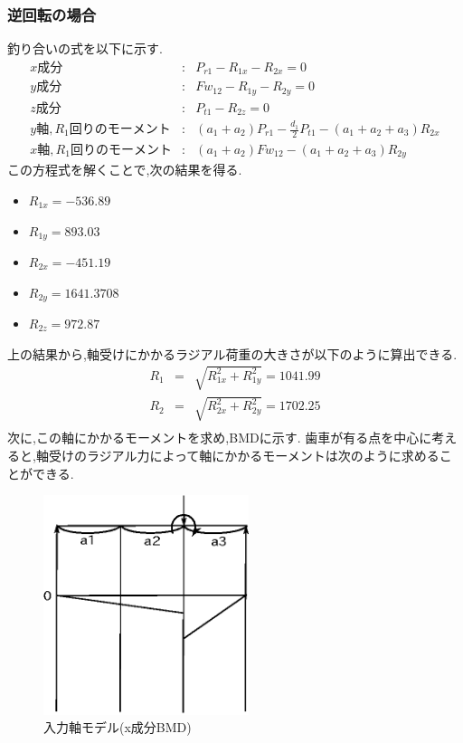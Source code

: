 \subsubsection{逆回転の場合}
釣り合いの式を以下に示す.
\begin{eqnarray}
x成分&:&P_{r1}-R_{1x}-R_{2x}=0\\
y成分&:&Fw_{12}-R_{1y}-R_{2y}=0\\
z成分&:&P_{t1}-R_{2z}=0\\
y軸,R_1回りのモーメント&:&(a_1+a_2)P_{r1}-\frac{d_1}{2}P_{t1}-(a_1+a_2+a_3)R_{2x}\\
x軸,R_1回りのモーメント&:&(a_1+a_2)Fw_{12}-(a_1+a_2+a_3)R_{2y}
\end{eqnarray}
この方程式を解くことで,次の結果を得る.
\begin{itemize}
\item $R_{1x}=-536.89$
\item $R_{1y}=893.03$
\item $R_{2x}=-451.19$
\item $R_{2y}=1641.3708$
\item $R_{2z}=972.87$
\end{itemize}
上の結果から,軸受けにかかるラジアル荷重の大きさが以下のように算出できる.
\begin{eqnarray}
R_1 &=& \sqrt {R_{1x}^2+R_{1y}^2}=1041.99\\
R_2 &=& \sqrt {R_{2x}^2+R_{2y}^2}=1702.25\\
\end{eqnarray}
次に,この軸にかかるモーメントを求め,BMDに示す.
歯車が有る点を中心に考えると,軸受けのラジアル力によって軸にかかるモーメントは次のように求めることができる.

\begin{figure}[htbp]
\begin{center}
\includegraphics[width=6cm]{../pictures/oneccwx.eps}
\end{center}
\caption{入力軸モデル(x成分BMD)}
\end{figure}


